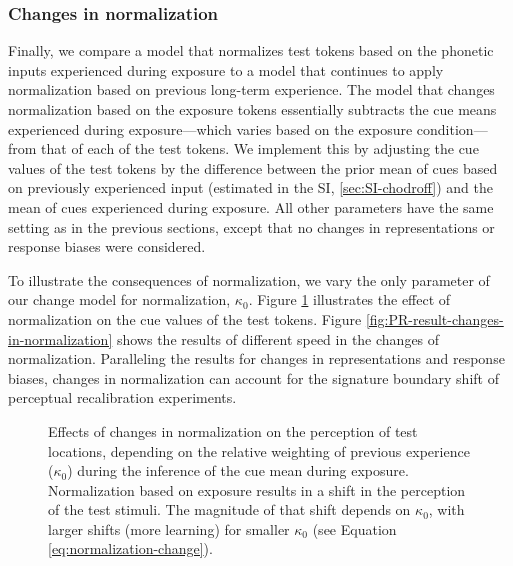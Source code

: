\documentclass[
  11pt,
  english,
  man,floatsintext]{apa6}
\begin{document}
\hypertarget{changes-in-normalization}{%
\subsubsection{Changes in normalization}\label{changes-in-normalization}}

Finally, we compare a model that normalizes test tokens based on the phonetic inputs experienced during exposure to a model that continues to apply normalization based on previous long-term experience. The model that changes normalization based on the exposure tokens essentially subtracts the cue means experienced during exposure---which varies based on the exposure condition---from that of each of the test tokens. We implement this by adjusting the cue values of the test tokens by the difference between the prior mean of cues based on previously experienced input (estimated in the SI, \ref{sec:SI-chodroff}) and the mean of cues experienced during exposure. All other parameters have the same setting as in the previous sections, except that no changes in representations or response biases were considered.

To illustrate the consequences of normalization, we vary the only parameter of our change model for normalization, \(\kappa_0\). Figure \ref{fig:PR-test-normalization} illustrates the effect of normalization on the cue values of the test tokens. Figure \ref{fig:PR-result-changes-in-normalization} shows the results of different speed in the changes of normalization. Paralleling the results for changes in representations and response biases, changes in normalization can account for the signature boundary shift of perceptual recalibration experiments.



\begin{figure}

{\centering {}

}

\caption[Effects of changes in normalization on the perception of test locations, depending on the relative weighting of previous experience (\(\kappa_0\)) during the inference of the cue mean during exposure. Normalization based on exposure results in a shift in the perception of the test stimuli. The magnitude of that shift depends on \(\kappa_0\), with larger shifts (more learning) for smaller \(\kappa_0\) (see Equation \eqref{eq:normalization-change}).]{Effects of changes in normalization on the perception of test locations, depending on the relative weighting of previous experience (\(\kappa_0\)) during the inference of the cue mean during exposure. Normalization based on exposure results in a shift in the perception of the test stimuli. The magnitude of that shift depends on \(\kappa_0\), with larger shifts (more learning) for smaller \(\kappa_0\) (see Equation \eqref{eq:normalization-change}).}\label{fig:PR-test-normalization}
\end{figure}
\end{document}
